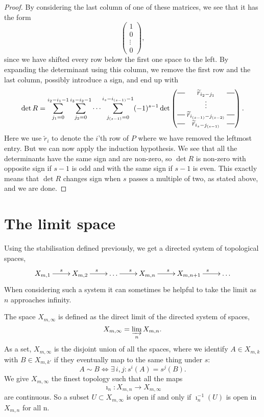 \begin{proof}
  By considering the last column of one of these matrices, we see that
  it has the form
  \[
  \begin{pmatrix}
    1 \\
    0 \\
    \vdots \\
    0
  \end{pmatrix}, \]
  since we have shifted every row below the first one space to the
  left. By expanding the determinant using this column, we remove the
  first row and the last column, possibly introduce a sign, and
  end up with
  \[ \det R = \sum_{j_1 = 0}^{i_2-i_1-1}\sum_{j_2 = 0}^{i_3-i_2-1}
  \dots \sum_{j_{(s-1)}=0}^{i_s-i_{(s-1)}-1} (-1)^{s-1} \det
  \begin{pmatrix}
    \matrow{\widetilde{r}_{i_2-j_1}} \\
    & \hspace{-0.75em} \vdots & \\
    \matrow{\widetilde{r}_{i_{(s-1)}-j_{(s-2)}}} \\
    \matrow{\widetilde{r}_{i_s-j_{(s-1)}}}
  \end{pmatrix}. \]
  Here we use $\widetilde{r}_i$ to denote the $i$'th row of $P$ where we
  have removed the leftmost entry. But we can now apply the induction
  hypothesis. We see that all the determinants have the same sign and
  are non-zero,
  so $\det R$ is non-zero with opposite sign if $s-1$ is odd and
  with the
  same sign if $s-1$ is even. This exactly means that $\det R$ changes
  sign
  when $s$ passes a multiple of two, as stated above, and we are done.
\end{proof}

\section{The limit space}
\label{sec:rum-gr}

Using the stabilisation defined previously, we get a directed system
of topological spaces,
\[ \xymatrix{X_{m,1} \ar[r]^s & X_{m,2} \ar[r]^s & \dots \ar[r]^s &
  X_{m,n} \ar[r]^s & X_{m,n+1} \ar[r]^s & \dots } \]
When considering such a system it can sometimes be helpful to
take the limit as $n$ approaches infinity.

\begin{definition}
  The space $X_{m,\infty}$ is defined as the direct limit of the
  directed system of spaces,
  \[ X_{m,\infty} = \varinjlim_n X_{m,n}. \]
  As a set, $X_{m,\infty}$ is the disjoint union of all the spaces,
  where we identify $A \in X_{m,k}$ with $B \in X_{m,k'}$ if they
  eventually map to the same thing under $s$:
  \[ A \sim B \iff \exists\, i,j : s^i(A) = s^j(B). \]
  We give $X_{m,\infty}$ the finest topology such that all the
  maps 
  \[ \imath_n : X_{m,n} \to X_{m,\infty} \]
  are continuous. So a subset $U \subset X_{m,\infty}$ is open if and
  only if $\imath_n^{-1}(U)$ is open in $X_{m,n}$ for all n.
\end{definition}

